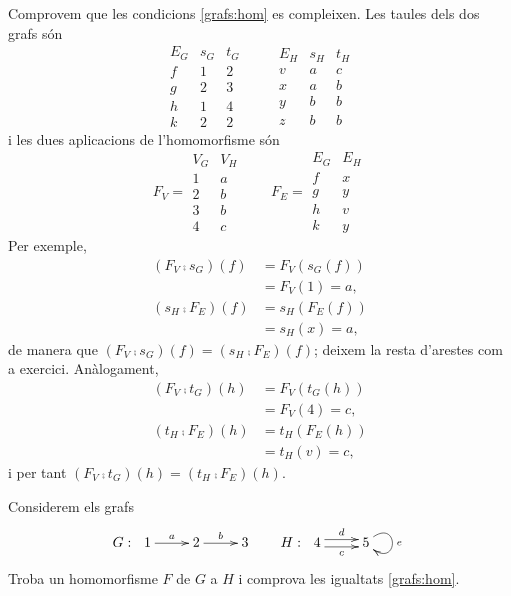 \begin{solucio}
Comprovem que les condicions \eqref{grafs:hom} es compleixen. Les taules dels dos grafs són
\[
    \begin{array}{c|c|c}
        E_G & s_G & t_G \\ \hline
        f & 1 & 2  \\
        g & 2 & 3 \\
        h & 1 & 4 \\
        k & 2 & 2 
    \end{array}
    \qquad
    \begin{array}{c|c|c}
        E_H & s_H & t_H \\ \hline
        v & a & c  \\
        x & a & b \\
        y & b & b \\
        z & b & b 
    \end{array}
\]
i les dues aplicacions de l'homomorfisme són
\[
F_V =
\begin{array}{c|c}
    V_G & V_H \\ \hline
     1 & a \\
     2 & b \\
     3 & b \\
     4 & c
\end{array}
\qquad
F_E =
\begin{array}{c|c}
   E_G  & E_H \\ \hline
   f & x \\
   g & y \\
   h & v \\
   k & y
\end{array}
\]
Per exemple,
\[
\begin{aligned}
(F_V\comp s_G)(f)&=F_V(s_G(f))\\
&=F_V(1)=a,\\
(s_H\comp F_E)(f)&=s_H(F_E(f))\\
&=s_H(x)=a,
\end{aligned}
\]
de manera que $(F_V\comp s_G)(f)=(s_H\comp F_E)(f)$; deixem la resta d'arestes com a exercici. Anàlogament,
\[
\begin{aligned}
(F_V\comp t_G)(h)&=F_V(t_G(h))\\
&=F_V(4)=c,\\
(t_H\comp F_E)(h)&=t_H(F_E(h))\\
&=t_H(v)=c,
\end{aligned}
\]
i per tant $(F_V\comp t_G)(h)=(t_H\comp F_E)(h)$.
\end{solucio}

\begin{exercici}
Considerem els grafs
\[
G:\ 
\xymatrix{
    1 \ar[r]^-{a} & 2 \ar[r]^-{b}& 3
}
\qquad
H:\ 
\xymatrix{
    4 \ar@<0.6ex>[r]^{d} \ar@<-0.6ex>[r]_{c} & 5 \ar@(ur,dr)^{e}
}
\]
Troba un homomorfisme $F$ de $G$ a $H$ i comprova les igualtats \eqref{grafs:hom}.
\end{exercici}

